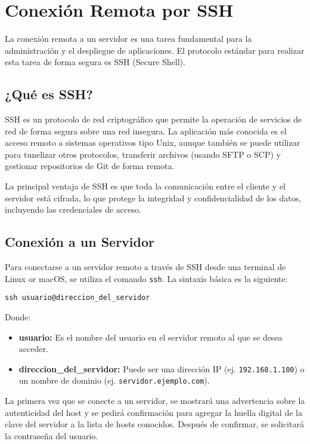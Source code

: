 \chapter{Conexión Remota por SSH}
\label{ch:conexion_ssh}

La conexión remota a un servidor es una tarea fundamental para la administración y el despliegue de aplicaciones. El protocolo estándar para realizar esta tarea de forma segura es SSH (Secure Shell).

\section{¿Qué es SSH?}

SSH es un protocolo de red criptográfico que permite la operación de servicios de red de forma segura sobre una red insegura. La aplicación más conocida es el acceso remoto a sistemas operativos tipo Unix, aunque también se puede utilizar para tunelizar otros protocolos, transferir archivos (usando SFTP o SCP) y gestionar repositorios de Git de forma remota.

La principal ventaja de SSH es que toda la comunicación entre el cliente y el servidor está cifrada, lo que protege la integridad y confidencialidad de los datos, incluyendo las credenciales de acceso.

\section{Conexión a un Servidor}

Para conectarse a un servidor remoto a través de SSH desde una terminal de Linux or macOS, se utiliza el comando \texttt{ssh}. La sintaxis básica es la siguiente:

\begin{verbatim}
ssh usuario@direccion_del_servidor
\end{verbatim}

Donde:
\begin{itemize}
    \item \textbf{usuario:} Es el nombre del usuario en el servidor remoto al que se desea acceder.
    \item \textbf{direccion\_del\_servidor:} Puede ser una dirección IP (ej. \texttt{192.168.1.100}) o un nombre de dominio (ej. \texttt{servidor.ejemplo.com}).
\end{itemize}

La primera vez que se conecte a un servidor, se mostrará una advertencia sobre la autenticidad del host y se pedirá confirmación para agregar la huella digital de la clave del servidor a la lista de hosts conocidos. Después de confirmar, se solicitará la contraseña del usuario.

